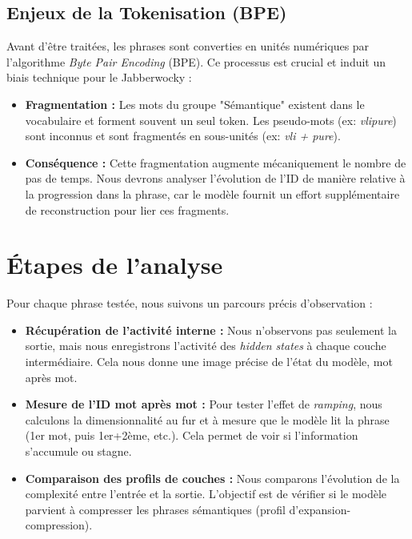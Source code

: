 \subsection{Enjeux de la Tokenisation (BPE)}
Avant d'être traitées, les phrases sont converties en unités numériques par l'algorithme \textit{Byte Pair Encoding} (BPE). Ce processus est crucial et induit un biais technique pour le Jabberwocky :
\begin{itemize}
    \item \textbf{Fragmentation :} Les mots du groupe "Sémantique" existent dans le vocabulaire et forment souvent un seul token. Les pseudo-mots (ex: \textit{vlipure}) sont inconnus et sont fragmentés en sous-unités (ex: \textit{vli + pure}).
    \item \textbf{Conséquence :} Cette fragmentation augmente mécaniquement le nombre de pas de temps. Nous devrons analyser l'évolution de l'ID de manière relative à la progression dans la phrase, car le modèle fournit un effort supplémentaire de reconstruction pour lier ces fragments.
\end{itemize}

\section{Étapes de l'analyse}

Pour chaque phrase testée, nous suivons un parcours précis d'observation :

\begin{itemize}
    \item \textbf{Récupération de l'activité interne :} Nous n'observons pas seulement la sortie, mais nous enregistrons l'activité des \textit{hidden states} à chaque couche intermédiaire. Cela nous donne une image précise de l'état du modèle, mot après mot.
    
    \item \textbf{Mesure de l'ID mot après mot :} Pour tester l'effet de \textit{ramping}, nous calculons la dimensionnalité au fur et à mesure que le modèle lit la phrase (1er mot, puis 1er+2ème, etc.). Cela permet de voir si l'information s'accumule ou stagne.
    
    \item \textbf{Comparaison des profils de couches :} Nous comparons l'évolution de la complexité entre l'entrée et la sortie. L'objectif est de vérifier si le modèle parvient à compresser les phrases sémantiques (profil d'expansion-compression).
\end{itemize}

